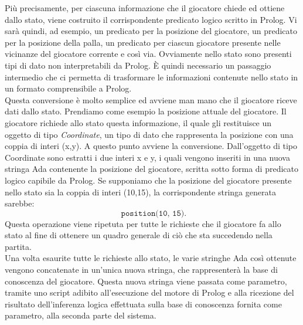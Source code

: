 Pi\`{u} precisamente, per ciascuna informazione che il giocatore chiede ed ottiene dallo stato, viene costruito il corrispondente predicato logico scritto in Prolog. Vi sar\`{a} quindi, ad esempio, un predicato per la posizione del giocatore, un predicato per la posizione della palla, un predicato per ciascun giocatore presente nelle vicinanze del giocatore corrente e cos\`{i} via. Ovviamente nello stato sono presenti tipi di dato non interpretabili da Prolog. \`{E} quindi necessario un passaggio intermedio che ci permetta di trasformare le informazioni contenute nello stato in un formato comprensibile a Prolog. \\
Questa conversione \`{e} molto semplice ed avviene man mano che il giocatore riceve dati dallo stato. Prendiamo come esempio la posizione attuale del giocatore. Il giocatore richiede allo stato questa informazione, il quale gli restituisce un oggetto di tipo \emph{Coordinate}, un tipo di dato che rappresenta la posizione con una coppia di interi (x,y). A questo punto avviene la conversione. Dall'oggetto di tipo Coordinate sono estratti i due interi x e y, i quali vengono inseriti in una nuova stringa Ada contenente la posizione del giocatore, scritta sotto forma di predicato logico capibile da Prolog. Se supponiamo che la posizione del giocatore presente nello stato sia la coppia di interi (10,15), la corrispondente stringa generata sarebbe: 
\begin{equation*}
	\texttt{ position(10, 15).} 
\end{equation*}
\noindent Questa operazione viene ripetuta per tutte le richieste che il giocatore fa allo stato al fine di ottenere un quadro generale di ci\`{o} che sta succedendo nella partita.\\
Una volta esaurite tutte le richieste allo stato, le varie stringhe Ada cos\`{i} ottenute vengono concatenate in un'unica nuova stringa, che rappresenterà la base di conoscenza del giocatore. Questa nuova stringa viene passata come parametro, tramite uno script adibito all'esecuzione del motore di Prolog e alla ricezione del risultato dell'inferenza logica effettuata sulla base di conoscenza fornita come parametro, alla seconda parte del sistema.

